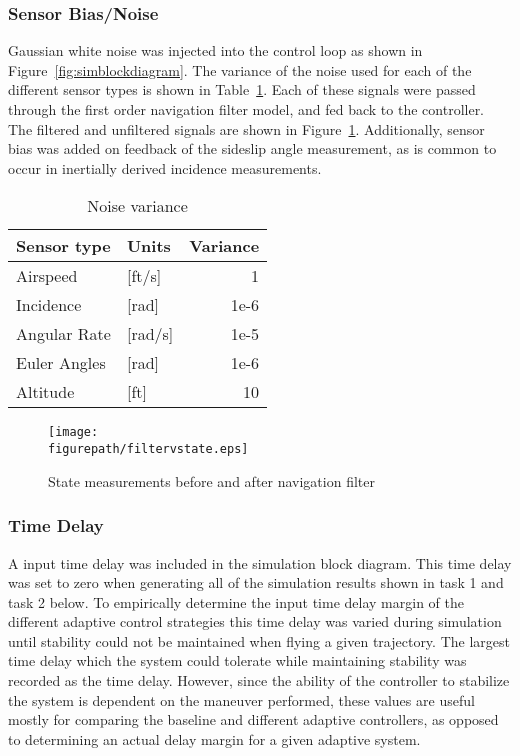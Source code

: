 \subsubsection*{Sensor Bias/Noise}

Gaussian white noise was injected into the control loop as shown in Figure~\ref{fig:simblockdiagram}.
The variance of the noise used for each of the different sensor types is shown in Table~\ref{tab:noise}.
Each of these signals were passed through the first order navigation filter model, and fed back to the controller.
The filtered and unfiltered signals are shown in Figure~\ref{fig:noise}.
Additionally, sensor bias was added on feedback of the sideslip angle measurement, as is common to occur in inertially derived incidence measurements.

\begin{table}[H]
  \centering
  \caption{Noise variance\label{tab:noise}}
  \small
  \begin{tabular}{llr}
    \toprule
    Sensor type & Units & Variance \\
    \midrule
    Airspeed & [ft/s] & 1 \\
    Incidence & [rad] & 1e-6 \\
    Angular Rate & [rad/s] & 1e-5 \\
    Euler Angles & [rad] & 1e-6 \\
    Altitude & [ft] & 10 \\
    \bottomrule
  \end{tabular}
\end{table}

\begin{figure}[H]
  \begin{center}
    \texttt{[image: \\figurepath/filtervstate.eps]}
    \caption{State measurements before and after navigation filter\label{fig:noise}}
  \end{center}
\end{figure}

\subsubsection*{Time Delay}

A input time delay was included in the simulation block diagram.
This time delay was set to zero when generating all of the simulation results shown in task 1 and task 2 below.
To empirically determine the input time delay margin of the different adaptive control strategies this time delay was varied during simulation until stability could not be maintained when flying a given trajectory.
The largest time delay which the system could tolerate while maintaining stability was recorded as the time delay.
However, since the ability of the controller to stabilize the system is dependent on the maneuver performed, these values are useful mostly for comparing the baseline and different adaptive controllers, as opposed to determining an actual delay margin for a given adaptive system.

